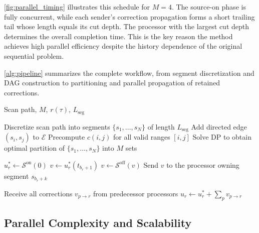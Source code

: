 \documentclass[conference]{IEEEtran}
\begin{document}
\cref{fig:parallel_timing} illustrates this schedule for $M=4$. The source-on phase is fully concurrent, while each sender's correction propagation forms a short trailing tail whose length equals its cut depth. The processor with the largest cut depth determines the overall completion time. This is the key reason the method achieves high parallel efficiency despite the history dependence of the original sequential problem.

\cref{alg:pipeline} summarizes the complete workflow, from segment discretization and DAG construction to partitioning and parallel propagation of retained corrections.


\begin{algorithm}
\caption{Parallel-in-Time LPBF Thermal Simulation}
\label{alg:pipeline}
\begin{algorithmic}[1]
\Require Scan path, $M$, $r(\tau)$, $L_{\mathrm{seg}}$

\State Discretize scan path into segments $\{s_1, \dots, s_N\}$ of length $L_{\mathrm{seg}}$
            \State Add directed edge $(s_i, s_j)$ to $\mathcal{E}$
        \EndIf
    \EndFor
\EndFor
\State Precompute $c(i,j)$ for all valid ranges $[i,j]$
\State Solve DP to obtain optimal partition of $\{s_1,\dots,s_N\}$ into $M$ sets

 
    \State $u^*_r \gets \mathcal{S}^{\mathrm{on}}(0)$
    \State $v \gets u^*_r(t_{b_r+1})$ 
     
        \State $v \gets \mathcal{S}^{\mathrm{off}}(v)$
        \State Send $v$ to the processor owning segment $s_{b_r+k}$
    \EndFor
\EndFor

 
    \State Receive all corrections $v_{p \to r}$ from predecessor processors
    \State $u_r \gets u^*_r + \sum_{p} v_{p \to r}$
\EndFor

\end{algorithmic}
\end{algorithm}






 
\subsection{Parallel Complexity and Scalability}
\label{seq:parallel_complexity}
\end{document}
